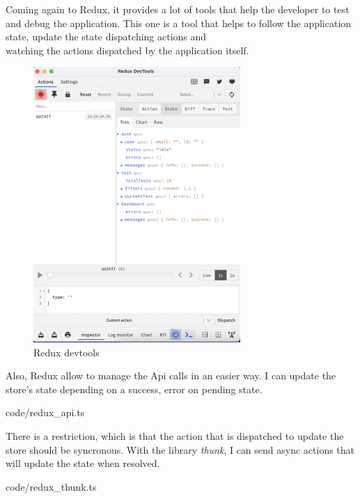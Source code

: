         Coming again to Redux, it provides a lot of tools that help the developer to test and debug the application. This one is a tool that helps to follow the application state, update the state dispatching actions and \\
        watching the actions dispatched by the application itself.
        \begin{figure}[H]
            \centering
                \includegraphics[width=0.7\textwidth]{assets/redux_devtools.png}
            \caption{Redux devtools}
            \label{fig:Redux devtools}
        \end{figure}

        Also, Redux allow to manage the Api calls in an easier way. I can update the store's state depending on a success, error on pending state.
        
        {code/redux_api.ts}

        There is a restriction, which is that the action that is dispatched to update the store should be syncronous. With the library \textit{thunk}, I can send async actions that will update the state when resolved.
        
        {code/redux_thunk.ts}

